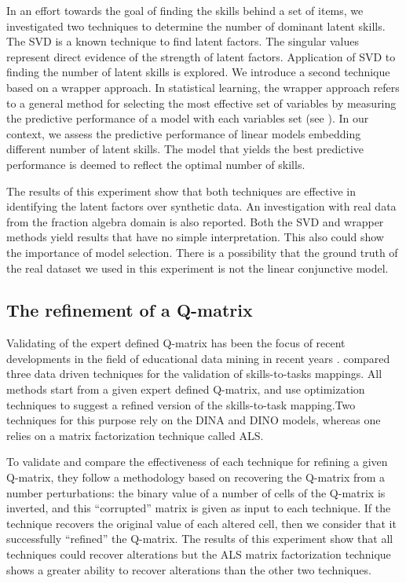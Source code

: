 In an effort towards the goal of finding the skills behind a set of items, we \citep{Beheshti2012Numbers}  investigated two techniques to determine the number of dominant latent skills. The SVD is a known technique to find latent factors. The singular values represent direct evidence of the strength of latent factors. Application of SVD to finding the number of latent skills is explored. We introduce a second technique based on a wrapper approach. In statistical learning, the wrapper approach refers to a general method for selecting the most effective set of variables by measuring the predictive performance of a model with each variables set (see \citep{Guyon2003}). In our context, we assess the predictive performance of linear models embedding different number of latent skills. The model that yields the best predictive performance is deemed to reflect the optimal number of skills.


The results of this experiment show that both techniques are effective in identifying the latent factors over synthetic data. An investigation with real data from the fraction algebra domain is also reported. Both the SVD and wrapper methods yield results that have no simple interpretation. This also could show the importance of model selection. There is a possibility that the ground truth of the real dataset we used in this experiment is not the linear conjunctive model.


\subsection{The refinement of a Q-matrix}
\label{edm2014}

Validating of the expert defined Q-matrix has been the focus of recent developments in the field of educational data mining in recent years \citep{delaTorre2008,chiu2013statistical,barnes2010novel,loye2011validite,Desmarais2013aied}. \citet{desmarais2014refinement} compared three data driven techniques for the validation of skills-to-tasks mappings.  All methods start from a given expert defined Q-matrix, and use optimization techniques to suggest a refined version of the skills-to-task mapping.Two techniques for this purpose rely on the DINA and DINO models, whereas one relies on a matrix factorization technique called ALS. 

To validate and compare the effectiveness of each technique for refining a given Q-matrix, they follow a methodology based on recovering the Q-matrix from a number perturbations: the binary value of a number of cells of the Q-matrix is inverted, and this ``corrupted'' matrix is given as input to each technique.  If the technique recovers the original value of each altered cell, then we consider that it successfully ``refined'' the Q-matrix. The results of this experiment show that all techniques could recover alterations but the ALS matrix factorization technique shows a greater ability to recover alterations than the other two techniques.



